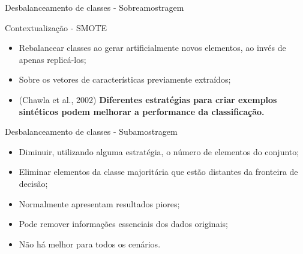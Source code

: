 \documentclass{beamer}
\begin{document}
\begin{frame}{Desbalanceamento de classes - Sobreamostragem}
\end{frame}
\begin{frame}{Contextualização - SMOTE}
\justifying
    \begin{itemize}
        \item Rebalancear classes ao gerar artificialmente novos elementos, ao invés de apenas replicá-los;
        \item Sobre os vetores de características previamente extraídos;
        \item (Chawla et al., 2002) \textbf{Diferentes estratégias para criar exemplos sintéticos podem melhorar a performance da classificação.}
    \end{itemize}
\end{frame}
\begin{frame}{Desbalanceamento de classes - Subamostragem}
    \begin{itemize}
        \item Diminuir, utilizando alguma estratégia, o número de elementos do conjunto;
        \item Eliminar elementos da classe majoritária que estão distantes da fronteira de decisão;
        \item Normalmente apresentam resultados piores;
        \item Pode remover informações essenciais dos dados originais;
        \item Não há melhor para todos os cenários.
    \end{itemize}

\end{frame}
\end{document}
